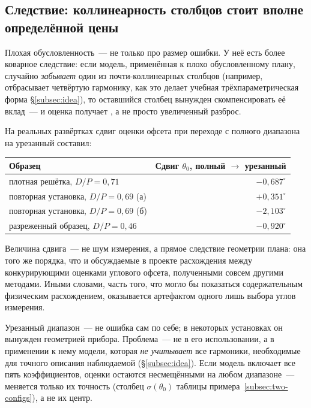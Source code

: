 \subsection{Следствие: коллинеарность столбцов стоит вполне определённой цены}
\label{subsec:consequence}

Плохая обусловленность~--- не только про размер ошибки. У неё есть более коварное следствие:
если модель, применённая к плохо обусловленному плану, случайно \emph{забывает} один из
почти-коллинеарных столбцов (например, отбрасывает четвёртую гармонику, как это делает учебная
трёхпараметрическая форма §\ref{subsec:idea}), то оставшийся столбец вынужден скомпенсировать её
вклад~--- и оценка получает , а не просто увеличенный разброс.

\begin{example}
На реальных развёртках сдвиг оценки офсета при переходе с полного диапазона на урезанный
составил:
\begin{center}
\footnotesize
\setlength{\tabcolsep}{7pt}
\begin{tabular}{@{}lr@{}}
\toprule
\textbf{Образец} & \textbf{Сдвиг $\theta_0$, полный $\to$ урезанный} \\
\midrule
плотная решётка, $D/P=0{,}71$        & $-0{,}687^\circ$ \\
повторная установка, $D/P=0{,}69$ (а) & $+0{,}351^\circ$ \\
повторная установка, $D/P=0{,}69$ (б) & $-2{,}103^\circ$ \\
разреженный образец, $D/P=0{,}46$    & $-0{,}920^\circ$ \\
\bottomrule
\end{tabular}
\end{center}
Величина сдвига~--- не шум измерения, а прямое следствие геометрии плана: она того же порядка,
что и обсуждаемые в проекте расхождения между конкурирующими оценками углового офсета,
полученными совсем другими методами. Иными словами, часть того, что могло бы показаться
содержательным физическим расхождением, оказывается артефактом одного лишь выбора углов
измерения.
\end{example}

\begin{warning}
Урезанный диапазон~--- не ошибка сам по себе; в некоторых установках он вынужден геометрией
прибора. Проблема~--- не в его использовании, а в применении к нему модели, которая \emph{не
учитывает} все гармоники, необходимые для точного описания наблюдаемой (§\ref{subsec:idea}).
Если модель включает все пять коэффициентов, оценки остаются несмещёнными на любом диапазоне~---
меняется только их точность (столбец $\sigma(\theta_0)$ таблицы примера~\ref{subsec:two-configs}),
а не их центр.
\end{warning}

